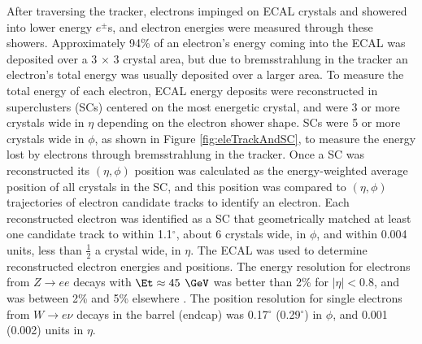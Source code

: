 After traversing the tracker, electrons impinged on ECAL crystals and showered into lower energy $e^{\pm}$s, and 
electron energies were measured through these showers.  Approximately 94\% of an electron's energy coming 
into the ECAL was deposited over a 3 $\times$ 3 crystal area, but due to bremsstrahlung in the tracker an electron's 
total energy was usually deposited over a larger area.  To measure the total energy of each electron, ECAL energy deposits 
were reconstructed in superclusters (SCs) centered on the most energetic crystal, and were 3 or more crystals wide 
in $\eta$ depending on the electron shower shape.  SCs were 5 or more crystals wide in $\phi$, as shown in Figure 
\ref{fig:eleTrackAndSC}, to measure the energy lost by electrons through bremsstrahlung in the tracker.  Once a SC 
was reconstructed its $(\eta, \phi)$ position was calculated as the energy-weighted average position of all crystals 
in the SC, and this position was compared to $(\eta, \phi)$ trajectories of electron candidate tracks to identify 
an electron.  Each reconstructed electron was identified as a SC that geometrically matched at least one candidate 
track to within 1.1$^{\circ}$, about 6 crystals wide, in $\phi$, and within 0.004 units, less than $\frac{1}{2}$ a 
crystal wide, in $\eta$.  The ECAL was used to determine reconstructed electron energies and positions.  The energy 
resolution for electrons from $Z \rightarrow ee$ decays with $\Et \approx 45$ $\GeV$ was better than 2\% for 
$|\eta| < 0.8$, and was between 2\% and 5\% elsewhere \cite{ecalPerformanceInCollisions}.  The position resolution 
for single electrons from $W \rightarrow e\nu$ decays in the barrel (endcap) was 0.17$^{\circ}$ (0.29$^{\circ}$) in 
$\phi$, and 0.001 (0.002) units in $\eta$.

